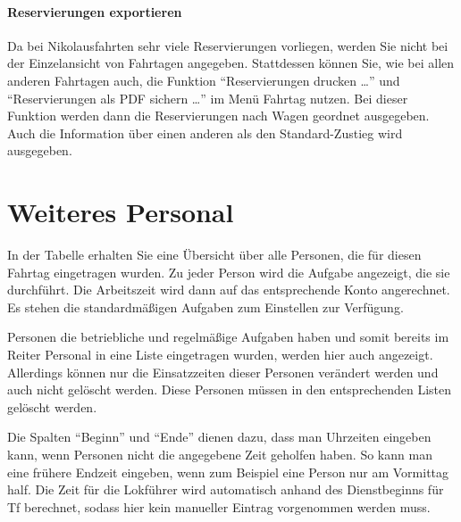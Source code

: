 \paragraph{Reservierungen exportieren}
Da bei Nikolausfahrten sehr viele Reservierungen vorliegen, werden Sie nicht bei der Einzelansicht von Fahrtagen angegeben.
Stattdessen können Sie, wie bei allen anderen Fahrtagen auch,
die Funktion ``Reservierungen drucken \dots'' und ``Reservierungen als PDF sichern \dots'' im Menü Fahrtag nutzen.
Bei dieser Funktion werden dann die Reservierungen nach Wagen geordnet ausgegeben.
Auch die Information über einen anderen als den Standard-Zustieg wird ausgegeben.


\section{Weiteres Personal}
In der Tabelle erhalten Sie eine Übersicht über alle Personen, die für diesen Fahrtag eingetragen wurden.
Zu jeder Person wird die Aufgabe angezeigt, die sie durchführt.
Die Arbeitszeit wird dann auf das entsprechende Konto angerechnet.
Es stehen die standardmäßigen Aufgaben zum Einstellen zur Verfügung.

Personen die betriebliche und regelmäßige Aufgaben haben und somit bereits im Reiter Personal in eine Liste eingetragen wurden, werden hier auch angezeigt.
Allerdings können nur die Einsatzzeiten dieser Personen verändert werden und auch nicht gelöscht werden.
Diese Personen müssen in den entsprechenden Listen gelöscht werden.


Die Spalten ``Beginn'' und ``Ende'' dienen dazu, dass man Uhrzeiten eingeben kann, wenn Personen nicht die angegebene Zeit geholfen haben.
So kann man eine frühere Endzeit eingeben, wenn zum Beispiel eine Person nur am Vormittag half.
Die Zeit für die Lokführer wird automatisch anhand des Dienstbeginns für Tf berechnet, sodass hier kein manueller Eintrag vorgenommen werden muss.
